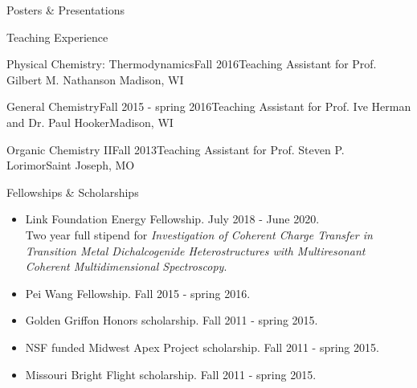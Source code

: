 \documentclass{resume} %
\begin{document}
\begin{rSection}{Posters \& Presentations}
\begin{etaremune}
	
\end{etaremune}
\end{rSection}



\begin{rSection}{Teaching Experience}
	
\begin{rSubsectionlistless}{Physical Chemistry: Thermodynamics}{Fall 2016}{Teaching Assistant for Prof. Gilbert M. Nathanson }{Madison, WI}
\end{rSubsectionlistless}

\begin{rSubsectionlistless}{General Chemistry}{Fall 2015 - spring 2016}{Teaching Assistant for Prof. Ive Herman and Dr. Paul Hooker}{Madison, WI}
\end{rSubsectionlistless}

\begin{rSubsectionlistless}{Organic Chemistry II}{Fall 2013}{Teaching Assistant for Prof. Steven P. Lorimor}{Saint Joseph, MO}
\end{rSubsectionlistless}

\end{rSection}


\begin{rSection}{Fellowships \& Scholarships}
	
\begin{itemize}[leftmargin = 0 pt]
	\item Link Foundation Energy Fellowship. July 2018 - June 2020. \\
	Two year full stipend for \emph{Investigation of Coherent Charge Transfer in Transition Metal Dichalcogenide Heterostructures with Multiresonant Coherent Multidimensional Spectroscopy}.
	\item Pei Wang Fellowship. Fall 2015 - spring 2016.
	\item Golden Griffon Honors scholarship. Fall 2011 - spring 2015.
	\item NSF funded Midwest Apex Project scholarship. Fall 2011 - spring 2015.
	\item Missouri Bright Flight scholarship. Fall 2011 - spring 2015.
\end{itemize}
	
\end{rSection}
\end{document}
